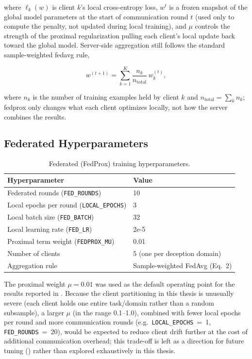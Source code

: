 where $\ell_k(w)$ is client $k$'s local cross-entropy loss, $w^t$ is a frozen snapshot of the global model parameters at the start of communication round $t$ (used only to compute the penalty, not updated during local training), and $\mu$ controls the strength of the proximal regularization pulling each client's local update back toward the global model. Server-side aggregation still follows the standard sample-weighted \gls{fedavg} rule,

\begin{equation}
w^{(t+1)} = \sum_{k=1}^{K} \frac{n_k}{n_{\text{total}}} \, w_k^{(t)},
\end{equation}

where $n_k$ is the number of training examples held by client $k$ and $n_{\text{total}} = \sum_k n_k$; \gls{fedprox} only changes what each client optimizes locally, not how the server combines the results.

\subsection{Federated Hyperparameters}

\begin{table}[htbp]
\centering
\caption{Federated (FedProx) training hyperparameters.}
\label{tab:fed-hparams}
\begin{tabular}{@{}ll@{}}
\toprule
\textbf{Hyperparameter} & \textbf{Value} \\
\midrule
Federated rounds (\texttt{FED\_ROUNDS}) & 10 \\
Local epochs per round (\texttt{LOCAL\_EPOCHS}) & 3 \\
Local batch size (\texttt{FED\_BATCH}) & 32 \\
Local learning rate (\texttt{FED\_LR}) & 2e-5 \\
Proximal term weight (\texttt{FEDPROX\_MU}) & 0.01 \\
Number of clients & 5 (one per deception domain) \\
Aggregation rule & Sample-weighted FedAvg (Eq.~2) \\
\bottomrule
\end{tabular}
\end{table}

The proximal weight $\mu = 0.01$ was used as the default operating point for the results reported in . Because the client partitioning in this thesis is unusually severe (each client holds one entire task/domain rather than a random subsample), a larger $\mu$ (in the range 0.1--1.0), combined with fewer local epochs per round and more communication rounds (e.g.\ \texttt{LOCAL\_EPOCHS}~=~1, \texttt{FED\_ROUNDS}~=~20), would be expected to reduce client drift further at the cost of additional communication overhead; this trade-off is left as a direction for future tuning () rather than explored exhaustively in this thesis.

